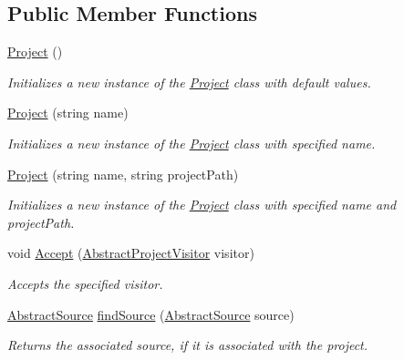 \subsection*{Public Member Functions}
\begin{DoxyCompactItemize}
\item 
\hyperlink{class_a_rdev_kit_1_1_model_1_1_project_1_1_project_a6bed8b5642e71c32a6e055f49ce4b186}{Project} ()
\begin{DoxyCompactList}\small\item\em Initializes a new instance of the \hyperlink{class_a_rdev_kit_1_1_model_1_1_project_1_1_project}{Project} class with default values. \end{DoxyCompactList}\item 
\hyperlink{class_a_rdev_kit_1_1_model_1_1_project_1_1_project_a27791a5b014dcb7d732f6527a6f4f03a}{Project} (string name)
\begin{DoxyCompactList}\small\item\em Initializes a new instance of the \hyperlink{class_a_rdev_kit_1_1_model_1_1_project_1_1_project}{Project} class with specified name. \end{DoxyCompactList}\item 
\hyperlink{class_a_rdev_kit_1_1_model_1_1_project_1_1_project_a8024daa2d023f14769c154148a0c1528}{Project} (string name, string project\-Path)
\begin{DoxyCompactList}\small\item\em Initializes a new instance of the \hyperlink{class_a_rdev_kit_1_1_model_1_1_project_1_1_project}{Project} class with specified name and project\-Path. \end{DoxyCompactList}\item 
void \hyperlink{class_a_rdev_kit_1_1_model_1_1_project_1_1_project_a2615d1d448f2db69a77b602391b2a91d}{Accept} (\hyperlink{class_a_rdev_kit_1_1_controller_1_1_project_controller_1_1_abstract_project_visitor}{Abstract\-Project\-Visitor} visitor)
\begin{DoxyCompactList}\small\item\em Accepts the specified visitor. \end{DoxyCompactList}\item 
\hyperlink{class_a_rdev_kit_1_1_model_1_1_project_1_1_abstract_source}{Abstract\-Source} \hyperlink{class_a_rdev_kit_1_1_model_1_1_project_1_1_project_aa03e2b5300ac356aaf2dfa4e587eb411}{find\-Source} (\hyperlink{class_a_rdev_kit_1_1_model_1_1_project_1_1_abstract_source}{Abstract\-Source} source)
\begin{DoxyCompactList}\small\item\em Returns the associated source, if it is associated with the project. \end{DoxyCompactList}\item 

\end{DoxyCompactItemize}
